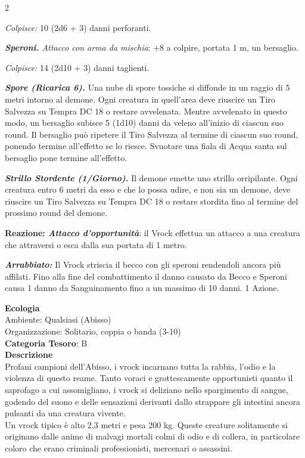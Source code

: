 \begin{multicols}{2}
{\emph{Colpisce:} 10 (2d6 + 3) danni perforanti.

\emph{\textbf{Speroni.} Attacco con arma da mischia}: +8 a colpire, portata 1 m, un bersaglio.

\emph{Colpisce:} 14 (2d10 + 3) danni taglienti.

\emph{\textbf{Spore (Ricarica 6).}} Una nube di spore tossiche si diffonde in un raggio di 5 metri intorno al demone. Ogni creatura in quell'area deve riuscire un Tiro Salvezza su Tempra DC 18 o restare avvelenata. Mentre avvelenato in questo modo, un bersaglio subisce 5 (1d10) danni da veleno all'inizio di ciascun suo round. Il bersaglio può ripetere il Tiro Salvezza al termine di ciascun suo round, ponendo termine all'effetto se lo riesce. Svuotare una fiala di Acqua santa sul bersaglio pone termine all'effetto.

\emph{\textbf{Strillo Stordente (1/Giorno).}} Il demone emette uno strillo orripilante. Ogni creatura entro 6 metri da esso e che lo possa udire, e non sia un demone, deve riuscire un Tiro Salvezza su Tempra DC 18 o restare stordita fino al termine del prossimo round del demone.

\textbf{Reazione: \emph{Attacco d'opportunità}}: il Vrock effettua un attacco a una creatura che attraversi o esca dalla sua portata di 1 metro.

\emph{\textbf{Arrabbiato:}} Il Vrock striscia il becco con gli speroni rendendoli ancora più affilati. Fino alla fine del combattimento il danno causato da Becco e Speroni causa 1 danno da Sanguinamento fino a un massimo di 10 danni. 1 Azione.

\textbf{Ecologia}\\
Ambiente: Qualsiasi (Abisso)\\
Organizzazione: Solitario, coppia o banda (3-10)\\
\textbf{Categoria Tesoro}: B\\
\textbf{Descrizione}\\
Profani campioni dell'Abisso, i vrock incarnano tutta la rabbia, l'odio e la violenza di questo reame. Tanto voraci e grottescamente opportunisti quanto il saprofago a cui assomigliano, i vrock si deliziano nello spargimento di sangue, godendo del suono e delle sensazioni derivanti dallo strappare gli intestini ancora pulsanti da una creatura vivente.\\
Un vrock tipico è alto 2,3 metri e pesa 200 kg. Queste creature solitamente si originano dalle anime di malvagi mortali colmi di odio e di collera, in particolare coloro che erano criminali professionisti, mercenari o assassini.

}
\end{multicols}
